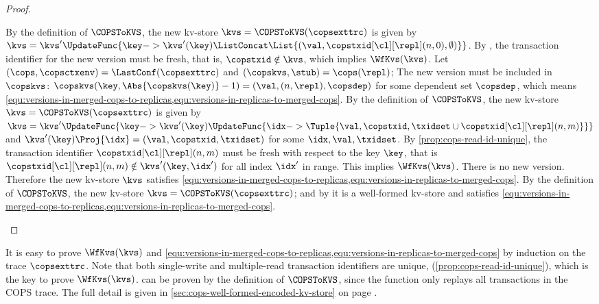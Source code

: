\begin{toappendix}
\begin{proof}
\begin{enumerate}
    \begin{enumerate}
        By the definition of \( \COPSToKVS \), 
        the new kv-store \( \kvs = \COPSToKVS(\copsexttrc) \) is given by
        \( \kvs = \kvs'\UpdateFunc{\key -> \kvs'(\key) \ListConcat \List{(\val,\copstxid[\cl][\repl](n,0),\emptyset)}} \).
        By \rCOPSWrite, the transaction identifier for the new version must be fresh, 
        that is, \( \copstxid \notin \kvs \), which implies \( \WfKvs(\kvs) \).
        Let \( (\cops,\copsctxenv) = \LastConf(\copsexttrc) \) and \( (\copskvs, \stub) = \cops(\repl) \);
        The new version must be included in \( \copskvs \):
        \( \copskvs(\key,\Abs{\copskvs(\key)} - 1) = (\val, (n,\repl),\copsdep ) \) 
        for some dependent set \( \copsdep \),
        which means \cref{equ:versions-in-merged-cops-to-replicas,equ:versions-in-replicas-to-merged-cops}.
        By the definition of \( \COPSToKVS \), 
        the new kv-store \( \kvs = \COPSToKVS(\copsexttrc) \) is given by
        \( \kvs = \kvs'\UpdateFunc{\key -> \kvs'(\key)\UpdateFunc{\idx -> \Tuple{\val,\copstxid,\txidset \cup \copstxid[\cl][\repl](n,m)}}} \)
        and \(\kvs'(\key)\Proj{\idx} = (\val,\copstxid,\txidset)\) for some \( \idx, \val, \txidset \).
        By \cref{prop:cops-read-id-unique},
        the transaction identifier \( \copstxid[\cl][\repl](n,m) \) must be fresh with respect to the key \( \key \),
        that is \( \copstxid[\cl][\repl](n,m) \notin \kvs'(\key,\idx') \) for all index \( \idx' \) in range.
        This implies \( \WfKvs(\kvs) \).
        There is no new version.
        Therefore the new kv-store \( \kvs \) satisfies \cref{equ:versions-in-merged-cops-to-replicas,equ:versions-in-replicas-to-merged-cops}.
        By the definition of \( \COPSToKVS \), the new kv-store \( \kvs = \COPSToKVS(\copsexttrc) \);
        and by \ih it is a well-formed kv-store and satisfies \cref{equ:versions-in-merged-cops-to-replicas,equ:versions-in-replicas-to-merged-cops}.  \qedhere
    \end{enumerate}
\end{enumerate}
\end{proof}
\begin{proofsketch}
It is easy to prove \(\WfKvs(\kvs)\) and 
\cref{equ:versions-in-merged-cops-to-replicas,equ:versions-in-replicas-to-merged-cops}
by induction on the trace \( \copsexttrc \).
Note that both single-write and multiple-read transaction identifiers are unique, (\cref{prop:cops-read-id-unique}),
which is the key to prove \(\WfKvs(\kvs)\).
can be proven by the definition of \( \COPSToKVS \), 
since the function only replays all transactions in the COPS trace.
The full detail is given in \cref{sec:cops-well-formed-encoded-kv-store}
on page \pageref{sec:cops-well-formed-encoded-kv-store}.
\end{proofsketch}
\end{toappendix}


